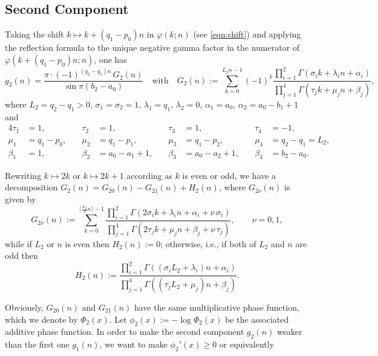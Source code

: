 \documentclass[a4paper,12pt]{article}
\theoremstyle{plain}
\def\vG{\varGamma}
\begin{document}
\subsection{Second Component} \label{subsec:2nd}
Taking the shift $k \mapsto k + (q_1-p_0) n$ in $\varphi(k; n)$ 
(see \eqref{eqn:shift}) and applying the reflection formula to the 
unique negative gamma factor in the numerator of 
$\varphi(k+(q_1-p_0) n; n)$, one has     
\[
g_2(n) = \frac{\pi \cdot (-1)^{(q_2 - q_1) n} \, G_2(n) }{\sin \pi(b_2-a_0)} 
\quad \mbox{with} \quad 
G_2(n) := \sum_{k=0}^{L_2 n -1}  (-1)^k
\frac{ \prod_{i=1}^2 \vG(\sigma_i k + \lambda_i n + \alpha_i)}{\prod_{j=1}^4 
\vG(\tau_j k + \mu_j n + \beta_j)}, 
\]
where $L_2 = q_2-q_1 > 0$, $\sigma_1 = \sigma_2 = 1$, $\lambda_1 = q_1$, 
$\lambda_2 = 0$, $\alpha_1 = a_0$, $\alpha_2 = a_0-b_1+1$ and 
\begin{alignat*}{4}
\tau_1 &= 1, \quad & \tau_2 &= 1, \quad & \tau_3 &= 1, \quad & \tau_4 &= -1, \\
\mu_1 &= q_1-p_0, \quad & \mu_2 &= q_1-p_1, \quad & \mu_3 &= q_1-p_2, \quad & 
\mu_4 &= q_2-q_1 = L_2, \\
\beta_1 &= 1, \quad & \beta_2 &= a_0-a_1+1, \quad & \beta_3 &= a_0-a_2+1, \quad & 
\beta_4 &= b_2-a_0.    
\end{alignat*} 
\par
Rewriting $k \mapsto 2 k$ or $k \mapsto 2 k+1$ according as $k$ is even or odd,  
we have a decomposition $G_2(n) = G_{20}(n) - G_{21}(n) + H_2(n)$, 
where $G_{2\nu}(n)$ is given by   
\[
G_{2\nu }(n) := \sum_{k=0}^{\lceil \frac{L_2}{2} n \rceil -1}   
\frac{ \prod_{i=1}^2 \vG(2 \sigma_i k + \lambda_i n + \alpha_i + 
\nu \, \sigma_i) }{\prod_{j=1}^4 \vG(2 \tau_j k + \mu_j n + \beta_j + \nu \, \tau_j )}, 
\qquad \nu = 0, 1, 
\]
while if $L_2$ or $n$ is even then $H_2(n) := 0$; otherwise, i.e.,  
if both of $L_2$ and $n$ are odd then  
\[
H_2(n) := \dfrac{\prod_{i=1}^2 \vG((\sigma_i L_2 + \lambda_i) n + 
\alpha_i) }{ \prod_{j=1}^4 \vG( (\tau_j L_2 + \mu_j) n + \beta_j ) }.  
\]
\par
Obviously, $G_{20}(n)$ and $G_{21}(n)$ have the same multiplicative 
phase function, which we denote by $\Phi_2(x)$. 
Let $\phi_2(x) := - \log \Phi_2(x)$ be the associated additive phase function. 
In order to make the second component $g_2(n)$ weaker than the 
first one $g_1(n)$, we want to make $\phi_2'(x) \ge 0$ or equivalently 
\end{document}
